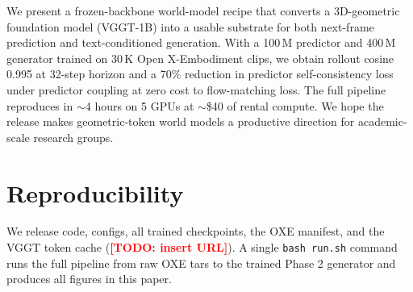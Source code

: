 \documentclass[10pt,letterpaper]{article}
\newcommand{\TODO}[1]{\textcolor{red}{\textbf{[TODO: #1]}}}
\begin{document}
We present a frozen-backbone world-model recipe that converts a 3D-geometric foundation model (VGGT-1B) into a usable substrate for both next-frame prediction and text-conditioned generation. With a 100\,M predictor and 400\,M generator trained on 30\,K Open X-Embodiment clips, we obtain rollout cosine 0.995 at 32-step horizon and a 70\% reduction in predictor self-consistency loss under predictor coupling at zero cost to flow-matching loss. The full pipeline reproduces in $\sim$4 hours on 5 GPUs at $\sim$\$40 of rental compute. We hope the release makes geometric-token world models a productive direction for academic-scale research groups.

\section*{Reproducibility}

We release code, configs, all trained checkpoints, the OXE manifest, and the VGGT token cache (\TODO{insert URL}). A single \texttt{bash run.sh} command runs the full pipeline from raw OXE tars to the trained Phase 2 generator and produces all figures in this paper.

\end{document}
